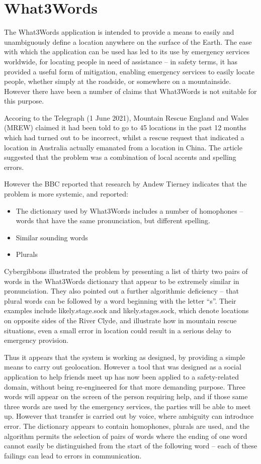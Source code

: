 \section{What3Words}\label{bkm:incacc:w3w}
The What3Words application is intended to provide a means to easily and unambiguously define a location anywhere on the surface of
the Earth. The ease with which the application can be used has led to its use by emergency services worldwide, for locating people in need of assistance -- in safety terms, it has provided a useful form of \gls{mitigation}, enabling emergency services to easily locate people,
whether simply at the roadside, or somewhere on a mountainside.
However there have been a number of claims that What3Words is not suitable for this purpose.

Accoring to the Telegraph (1 June 2021),
Mountain Rescue England and Wales (MREW) claimed it had been told to go to 45 locations in the past 12 months which had turned out
to be incorrect, whilst a rescue request that indicated a location in Australia actually emanated from a location in China.
The article suggested that the problem was a combination of local accents and spelling errors.

However the BBC reported that research by Andew Tierney indicates that the problem is more systemic, and reported:
\begin{itemize}
\item The dictionary used by What3Words includes a number of homophones -- words that have the same pronunciation, but different spelling.
\item Similar sounding words
\item Plurals
\end{itemize}
Cybergibbons illustrated the problem by presenting a list of thirty two pairs of words in the What3Words dictionary that appear to
be extremely similar in pronunciation. They also pointed out a further algorithmic deficiency -- that plural words can be followed
by a word beginning with the letter ``s''. Their examples include likely.stage.sock and likely.stages.sock, which denote locations on opposite sides of the River Clyde, and illustrate how in mountain rescue situations, even a small error in location could result in
a serious delay to emergency provision.

Thus it appears that the system is working as designed, by providing a simple means to carry out geolocation.
However a tool that was designed as a social application to help friends meet up has now been applied to a safety-related domain,
without being re-engineered for that more demanding purpose.
Three words will appear on the screen of the person requiring help, and if those same three words are used by the emergency services,
the parties will be able to meet up.
However that transfer is carried out by voice, where ambiguity can introduce error.
The dictionary appears to contain homophones, plurals are used, and the algorithm permits the selection of pairs of words where the
ending of one word cannot easily be distinguished from the start of the following word -- each of these failings can lead to
errors in communication. 

